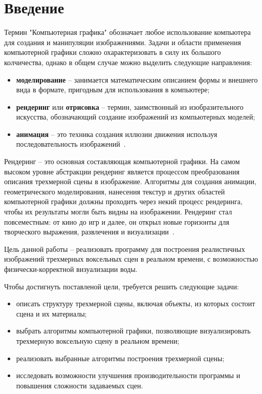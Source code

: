 \chapter*{Введение}

Термин "Компьютерная графика" обозначает любое использование компьютера для создания 
и манипуляции изображениями. Задачи и области применения компьютерной графики 
сложно охарактеризовать в силу их большого колчичества, однако в общем случае можно выделить 
следующие направления:
\begin{itemize}
    \item \textbf{моделирование} -- занимается математическим описанием формы и внешнего вида
в формате, пригодным для использования в компьютере;
    \item \textbf{рендеринг} или \textbf{отрисовка} -- термин, заимствонный из изобразительного 
искусства, обозначающий создание изображений из компьютерных моделей;
    \item \textbf{анимация} -- это техника создания иллюзии движения используя последовательность изображений~\cite{FoCG}.
\end{itemize}

Рендеринг -- это основная составляющая компьютерной графики. 
На самом высоком уровне абстракции рендеринг является процессом 
преобразования описания трехмерной сцены в изображение. Алгоритмы для создания 
анимации, геометрического моделирования, нанесения текстур и других областей 
компьютерной графики должны проходить через некий процесс рендеринга, 
чтобы их результаты могли быть видны на изображении. Рендеринг стал 
повсеместным: от кино до игр и далее, он открыл новые горизонты для 
творческого выражения, развлечения и визуализации~\cite{PBRT3e}.

Цель данной работы -- реализовать программу для построения 
реалистичных изображений трехмерных воксельных сцен в реальном времени,
с возможностью физически-корректной визуализации воды.

Чтобы достигнуть поставленой цели, требуется решить следующие задачи:
\begin{itemize}
    \item описать структуру трехмерной сцены, включая объекты, из которых
          состоит сцена и их материалы;
    \item выбрать алгоритмы компьютерной 
          графики, позволяющие визуализировать трехмерную воксельную
          сцену в реальном времени;
    \item реализовать выбранные алгоритмы построения трехмерной сцены;
    \item исследовать возможности улучшения производительности программы
          и повышения сложности задаваемых сцен.
\end{itemize}
